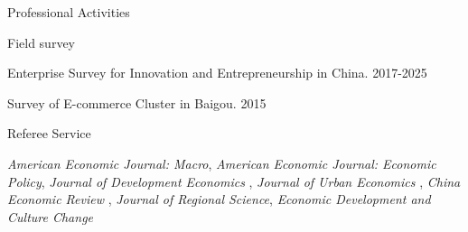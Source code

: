 \documentclass{resume} %
\begin{document}
\begin{rSection}{Professional Activities}

\begin{rSubsection}{Field survey}{}{}{}
\item Enterprise Survey for Innovation and Entrepreneurship in China. 2017-2025
\item Survey of E-commerce Cluster in Baigou. 2015
\end{rSubsection}

\begin{rSubsection}{Referee Service}{}{}{}
\item {\em American Economic Journal: Macro}, {\em American Economic Journal: Economic Policy}, {\em Journal of Development Economics} , {\em Journal of Urban Economics} , {\em China Economic Review} , {\em Journal of Regional Science}, {\em Economic Development and Culture Change} 
\end{rSubsection}



\end{rSection}
\end{document}
